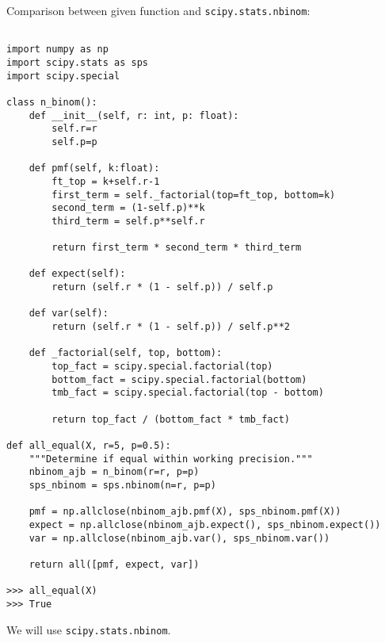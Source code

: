 Comparison between given function and \texttt{scipy.stats.nbinom}:

\begin{verbatim}

import numpy as np
import scipy.stats as sps
import scipy.special

class n_binom():
    def __init__(self, r: int, p: float):
        self.r=r
        self.p=p
    
    def pmf(self, k:float):
        ft_top = k+self.r-1
        first_term = self._factorial(top=ft_top, bottom=k)
        second_term = (1-self.p)**k
        third_term = self.p**self.r

        return first_term * second_term * third_term

    def expect(self):
        return (self.r * (1 - self.p)) / self.p
    
    def var(self):
        return (self.r * (1 - self.p)) / self.p**2
    
    def _factorial(self, top, bottom):
        top_fact = scipy.special.factorial(top)
        bottom_fact = scipy.special.factorial(bottom)
        tmb_fact = scipy.special.factorial(top - bottom)

        return top_fact / (bottom_fact * tmb_fact)
 
def all_equal(X, r=5, p=0.5):
    """Determine if equal within working precision."""
    nbinom_ajb = n_binom(r=r, p=p)
    sps_nbinom = sps.nbinom(n=r, p=p)

    pmf = np.allclose(nbinom_ajb.pmf(X), sps_nbinom.pmf(X))
    expect = np.allclose(nbinom_ajb.expect(), sps_nbinom.expect())
    var = np.allclose(nbinom_ajb.var(), sps_nbinom.var())

    return all([pmf, expect, var])

>>> all_equal(X)
>>> True
\end{verbatim}

We will use \texttt{scipy.stats.nbinom}.